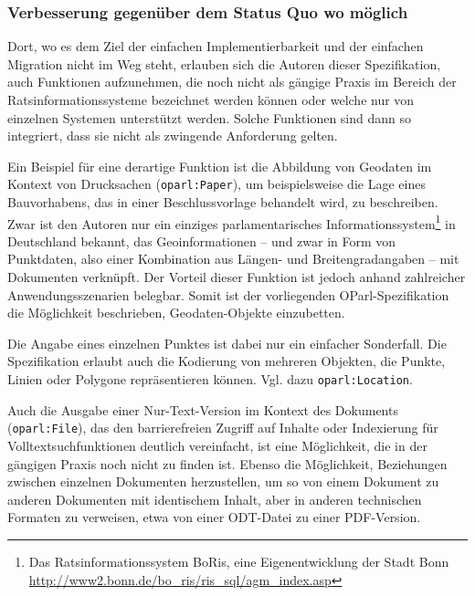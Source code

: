 \documentclass[,a4paper]{article}
\begin{document}
\subsubsection{Verbesserung gegenüber dem Status Quo wo
möglich}\label{verbesserung-gegenuxfcber-dem-status-quo-wo-muxf6glich}

Dort, wo es dem Ziel der einfachen Implementierbarkeit und der einfachen
Migration nicht im Weg steht, erlauben sich die Autoren dieser
Spezifikation, auch Funktionen aufzunehmen, die noch nicht als gängige
Praxis im Bereich der Ratsinformationssysteme bezeichnet werden können
oder welche nur von einzelnen Systemen unterstützt werden. Solche
Funktionen sind dann so integriert, dass sie nicht als zwingende
Anforderung gelten.

Ein Beispiel für eine derartige Funktion ist die Abbildung von Geodaten
im Kontext von Drucksachen (\texttt{oparl:Paper}), um beispielsweise die
Lage eines Bauvorhabens, das in einer Beschlussvorlage behandelt wird,
zu beschreiben. Zwar ist den Autoren nur ein einziges parlamentarisches
Informationssystem\footnote{Das Ratsinformationssystem BoRis, eine
  Eigenentwicklung der Stadt Bonn
  \url{http://www2.bonn.de/bo_ris/ris_sql/agm_index.asp}} in Deutschland
bekannt, das Geoinformationen -- und zwar in Form von Punktdaten, also
einer Kombination aus Längen- und Breitengradangaben -- mit Dokumenten
verknüpft. Der Vorteil dieser Funktion ist jedoch anhand zahlreicher
Anwendungsszenarien belegbar. Somit ist der vorliegenden
OParl-Spezifikation die Möglichkeit beschrieben, Geodaten-Objekte
einzubetten.

Die Angabe eines einzelnen Punktes ist dabei nur ein einfacher
Sonderfall. Die Spezifikation erlaubt auch die Kodierung von mehreren
Objekten, die Punkte, Linien oder Polygone repräsentieren können. Vgl.
dazu \texttt{oparl:Location}.

Auch die Ausgabe einer Nur-Text-Version im Kontext des Dokuments
(\texttt{oparl:File}), das den barrierefreien Zugriff auf Inhalte oder
Indexierung für Volltextsuchfunktionen deutlich vereinfacht, ist eine
Möglichkeit, die in der gängigen Praxis noch nicht zu finden ist. Ebenso
die Möglichkeit, Beziehungen zwischen einzelnen Dokumenten herzustellen,
um so von einem Dokument zu anderen Dokumenten mit identischem Inhalt,
aber in anderen technischen Formaten zu verweisen, etwa von einer
ODT-Datei zu einer PDF-Version.

\end{document}
